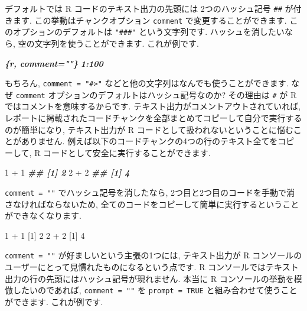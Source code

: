 \documentclass[
  11pt,
  lualatex,ja=standard,jafont=noto]{bxjsreport}
\newenvironment{Shaded}{\begin{snugshade}}{\end{snugshade}}
\newcommand{\DecValTok}[1]{\textcolor[rgb]{0.00,0.00,0.81}{#1}}
\newcommand{\DocumentationTok}[1]{\textcolor[rgb]{0.56,0.35,0.01}{\textbf{\textit{#1}}}}
\newcommand{\InformationTok}[1]{\textcolor[rgb]{0.56,0.35,0.01}{\textbf{\textit{#1}}}}
\newcommand{\NormalTok}[1]{#1}
\newcommand{\SpecialCharTok}[1]{\textcolor[rgb]{0.00,0.00,0.00}{#1}}
\begin{document}
デフォルトでは R コードのテキスト出力の先頭には 2つのハッシュ記号 \texttt{\#\#} が付きます. この挙動はチャンクオプション \texttt{comment} で変更することができます. このオプションのデフォルトは \texttt{"\#\#\#"} という文字列です. ハッシュを消したいなら, 空の文字列を使うことができます. これが例です.

\begin{Shaded}
\begin{Highlighting}[]
\InformationTok{\textasciigrave{}\textasciigrave{}\textasciigrave{}\{r, comment=""\}}
\InformationTok{1:100}
\InformationTok{\textasciigrave{}\textasciigrave{}\textasciigrave{}}
\end{Highlighting}
\end{Shaded}

もちろん, \texttt{comment = "\#\textgreater{}"} などと他の文字列はなんでも使うことができます. なぜ \texttt{comment} オプションのデフォルトはハッシュ記号なのか? その理由は \texttt{\#} が R ではコメントを意味するからです. テキスト出力がコメントアウトされていれば, レポートに掲載されたコードチャンクを全部まとめてコピーして自分で実行するのが簡単になり, テキスト出力が R コードとして扱われないということに悩むことがありません. 例えば以下のコードチャンクの4つの行のテキスト全てをコピーして, R コードとして安全に実行することができます.

\begin{Shaded}
\begin{Highlighting}[numbers=left,,]
\DecValTok{1} \SpecialCharTok{+} \DecValTok{1}
\DocumentationTok{\#\# [1] 2}
\DecValTok{2} \SpecialCharTok{+} \DecValTok{2}
\DocumentationTok{\#\# [1] 4}
\end{Highlighting}
\end{Shaded}

\texttt{comment = ""} でハッシュ記号を消したなら, 2つ目と2つ目のコードを手動で消さなければならないため, 全てのコードをコピーして簡単に実行するということができなくなります.

\begin{Shaded}
\begin{Highlighting}[numbers=left,,]
\DecValTok{1} \SpecialCharTok{+} \DecValTok{1}
\NormalTok{[}\DecValTok{1}\NormalTok{] }\DecValTok{2}
\DecValTok{2} \SpecialCharTok{+} \DecValTok{2}
\NormalTok{[}\DecValTok{1}\NormalTok{] }\DecValTok{4}
\end{Highlighting}
\end{Shaded}

\texttt{comment = ""} が好ましいという主張の1つには, テキスト出力が R コンソールのユーザーにとって見慣れたものになるという点です. R コンソールではテキスト出力の行の先頭にはハッシュ記号が現れません. 本当に R コンソールの挙動を模倣したいのであれば, \texttt{comment = ""} を \texttt{prompt = TRUE} と組み合わせて使うことができます. これが例です.
\end{document}
